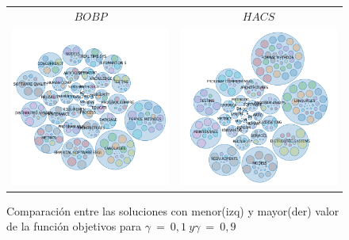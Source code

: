 \begin{figure}[H]
\begin{tabular}{cc}
		$BOBP$ & $HACS$\\
		\includegraphics[width=0.45\linewidth]{img/gamma-09-burbujas-alg-3.png}&
		\includegraphics[width=0.45\linewidth]{img/gamma-09-burbujas-alg-1.png}\\
	\end{tabular}
	\caption{Comparación entre las soluciones con menor(izq) y mayor(der) valor de la función objetivos  para $\gamma\ =\ 0,1\ y \gamma\ =\ 0,9$}
	\label{res:comp1}
\end{figure}

